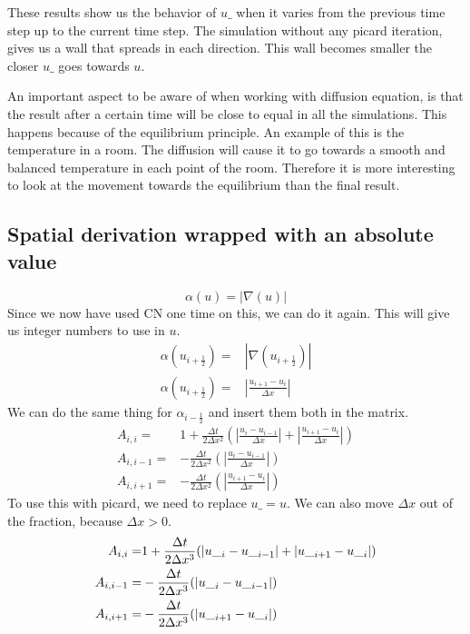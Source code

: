 \documentclass{article}
\begin{document}
These results show us the behavior of $u\_$ when it varies from the previous
time step up to the current time step. The simulation without any picard
iteration, gives us a wall that spreads in each direction. This wall becomes
smaller the closer $u\_$ goes towards $u$. 

An important aspect to be aware of when working with
diffusion equation, is that the result after a certain time will be close to  equal in all
the simulations. This happens because of the equilibrium principle. An example
of this is the temperature in a room. The diffusion will cause it to go towards a smooth and
balanced temperature in each point of the room. Therefore it is more interesting
to look at the movement towards the equilibrium than the final result.

\subsection{Spatial derivation wrapped with an absolute value}

\begin{equation}
\alpha(u) = |\nabla(u)|
\end{equation}
Since we now have used CN one time on this, we can do it again. This will give
us integer numbers to use in $u$.
\begin{align*}
\alpha(u_{i+\frac{1}{2}}) =& \left|\nabla(u_{i+\frac{1}{2}})\right|\\
\alpha(u_{i+\frac{1}{2}}) =& \left|\frac{u_{i+1}-u_i}{\Delta x}\right|
\end{align*}
We can do the same thing for $\alpha_{i-\frac{1}{2}}$ and insert them both in
the matrix.
\begin{align*} 
A_{i,i} =& 1+\frac{\Delta t}{2\Delta x^2}(\left|\frac{u_i-u_{i-1}}{\Delta x}\right|+ \left|\frac{u_{i+1}-u_i}{\Delta x}\right|)\\
A_{i,i-1} =&-\frac{\Delta t}{2\Delta x^2}(\left|\frac{u_i-u_{i-1}}{\Delta x}\right|)\\
A_{i,i+1} =&-\frac{\Delta t}{2\Delta x^2}(\left|\frac{u_{i+1}-u_i}{\Delta x}\right|)
\end{align*}                               
To use this with picard, we need to replace $u\_=u$. We can also move $\Delta x$
out of the fraction, because $\Delta x > 0$.
\begin{align} \label{eq:matrix_absolute}
A_{i,i} =& 1+\frac{\Delta t}{2\Delta x^3}(\left|u\__i-u\__{i-1}\right|+ \left|u\__{i+1}-u\__i\right|)\notag\\
A_{i,i-1} =&-\frac{\Delta t}{2\Delta x^3}(\left|u\__i-u\__{i-1}\right|)\notag\\
A_{i,i+1} =&-\frac{\Delta t}{2\Delta x^3}(\left|u\__{i+1}-u\__i\right|)
\end{align}                               
\end{document}
